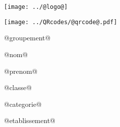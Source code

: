 \Huge

\begin{block} %
{}\hfill {}
{}\hfill {}
\begin{minipage}{0.15\linewidth}
\texttt{[image: ../@logo@]}
\end{minipage}
{}\hfill {}



\begin{minipage}{0.48\linewidth}
\texttt{[image: ../QRcodes/@qrcode@.pdf]}

\vspace{0.5cm}

@groupement@
\end{minipage}
\begin{minipage}{0.5\linewidth}
{}\hfill {}
{}\hfill {}

\bigskip

\begin{center}
@nom@

@prenom@

@classe@

@categorie@

@etablissement@
\end{center}
\end{minipage}

\end{block}

\vfill


\vfill
